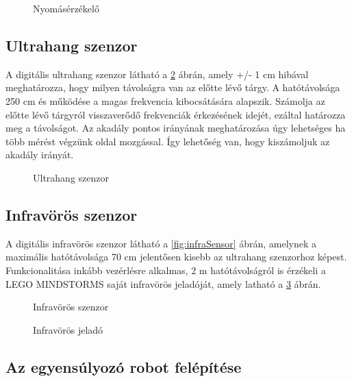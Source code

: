 \begin{figure}[!htb]
	\centering
	\caption{Nyomásérzékelő}
	\label{fig:touchSensor}
\end{figure}

\subsection{Ultrahang szenzor}
A digitális ultrahang szenzor látható a \ref{fig:ultrasonicSensor} ábrán, amely +/- 1 cm hibával meghatározza, hogy milyen távolságra van az előtte lévő tárgy. A hatótávolsága 250 cm és működése a magas frekvencia kibocsátására  alapszik. Számolja az előtte lévő tárgyról visszaverődő frekvenciák érkezésének idejét, ezáltal határozza meg a távolságot. Az akadály pontos irányának meghatározása úgy lehetséges ha több mérést végzünk oldal mozgással. Így lehetőség van, hogy kiszámoljuk az akadály irányát.

\begin{figure}[!htb]
	\centering
	\caption{Ultrahang szenzor}
	\label{fig:ultrasonicSensor}
\end{figure}

\subsection{Infravörös szenzor}
A digitális infravörös szenzor látható a \ref{fig:infraSensor} ábrán, amelynek a maximális hatótávolsága 70 cm jelentősen kisebb az ultrahang szenzorhoz képest. Funkcionalitása inkább vezérlésre alkalmas, 2 m hatótávolságról is érzékeli a LEGO MINDSTORMS saját infravörös jeladóját, amely latható a \ref{fig:beacon} ábrán.

\begin{figure}[!htb]
	\centering
	\caption{Infravörös szenzor}
	\label{fig:infraSensor}
	\endminipage
	\caption{Infravörös jeladó}
	\label{fig:beacon}
	\endminipage
\end{figure}

\subsection{Az egyensúlyozó robot felépítése}

